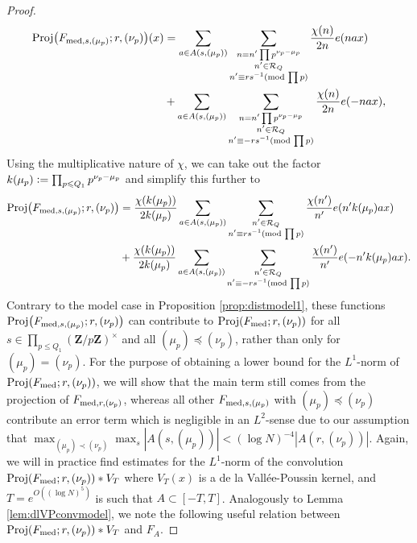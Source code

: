 \documentclass[11pt, reqno]{amsart}
\newcommand{\mdsub}[1]{\ensuremath{(\mbox{\scriptsize mod}\, #1)}}
\DeclareMathOperator{\Proj}{Proj}
\begin{document}
\begin{proof}
    \begin{align*}
        \Proj\bigl(F_{\textnormal{med},s,(\mu_p)};r,(\nu_p)\bigr)(x)&=\sum_{a\in A(s,(\mu_p))}\sum_{\substack{n=n'\prod p^{\nu_p-\mu_p}\\ n'\in\mathcal{R}_Q\\ n'\equiv rs^{-1}\mdsub{\prod p}}}\frac{\chi(n)}{2n}e(nax)\\
        &+ \sum_{a\in A(s,(\mu_p))}\sum_{\substack{n=n'\prod p^{\nu_p-\mu_p}\\ n'\in \mathcal{R}_Q \\ n'\equiv -rs^{-1}\mdsub{\prod p}}}\frac{\chi(n)}{2n}e(-nax),
    \end{align*}
    Using the multiplicative nature of $\chi$, we can take out the factor $k(\mu_p)\vcentcolon=\prod_{p\leqslant Q_1} p^{\nu_p-\mu_p}$ and simplify this further to
    \begin{align}\label{eq:projcont} 
    \Proj\bigl(F_{\textnormal{med},s,(\mu_p)};r,(\nu_p)\bigr)&=\frac{\chi(k(\mu_p))}{2k(\mu_p)}\sum_{a\in A(s,(\mu_p))}\sum_{\substack{n'\in\mathcal{R}_Q\\ n'\equiv rs^{-1}\mdsub{\prod p}}}\frac{\chi(n')}{n'}e(n'k(\mu_p)ax)\\
    &+\frac{\chi(k(\mu_p))}{2k(\mu_p)}\sum_{a\in A(s,(\mu_p))}\sum_{\substack{n'\in\mathcal{R}_Q \\ n'\equiv -rs^{-1}\mdsub{\prod p}}}\frac{\chi(n')}{n'}e(-n'k(\mu_p)ax).\nonumber
    \end{align}
    Contrary to the model case in Proposition \ref{prop:distmodel1}, these functions $\Proj\bigl(F_{\textnormal{med},s,(\mu_p)};r,(\nu_p)\bigr)$ can contribute to $\Proj(F_\textnormal{med};r,(\nu_p))$ for all $s\in\prod_{p\leqslant Q_1}(\mathbf{Z}/p\mathbf{Z})^\times$ and all $(\mu_p)\preceq(\nu_p)$, rather than only for $(\mu_p)=(\nu_p)$. For the purpose of obtaining a lower bound for the $L^1$-norm of $\Proj(F_\textnormal{med};r,(\nu_p))$, we will show that the main term still comes from the projection of $F_{\textnormal{med},r,(\nu_p)}$, whereas all other $F_{\textnormal{med},s,(\mu_p)}$ with $(\mu_p)\preceq (\nu_p)$ contribute an error term which is negligible in an $L^2$-sense due to our assumption that $\max_{(\mu_p)\prec(\nu_p)} \max_s|A(s,(\mu_p))|<(\log N)^{-4}|A(r,(\nu_p))|$. Again, we will in practice find estimates for the $L^1$-norm of the convolution $\Proj(F_\textnormal{med};r,(\nu_p))*V_{T}$ where $V_{T}(x)$ is a de la Vall\'ee-Poussin kernel, and $T=e^{O((\log N)^5)}$ is such that $A\subset [-T,T]$. Analogously to Lemma \ref{lem:dlVPconvmodel}, we note the following useful relation between $\Proj(F_\textnormal{med};r,(\nu_p))*V_{T}$ and $F_A$.

\end{proof}
\end{document}
